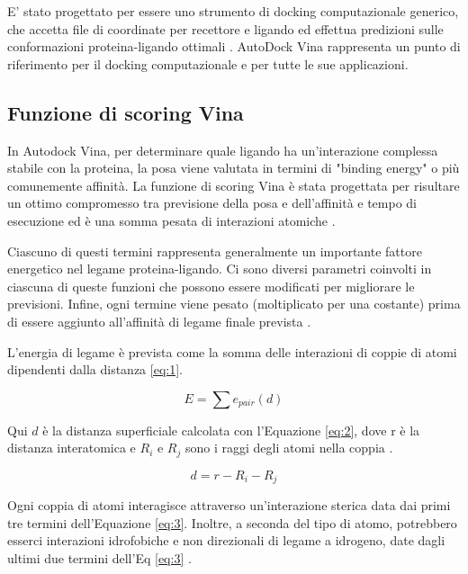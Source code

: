 E' stato progettato per essere uno strumento di docking computazionale generico, che accetta file di coordinate per recettore e ligando ed effettua predizioni sulle conformazioni proteina-ligando ottimali \cite{forli_computational_2016}.
AutoDock Vina rappresenta un punto di riferimento per il docking computazionale e per tutte le sue applicazioni.

\subsection{Funzione di scoring Vina} \label{scoring_function_vina}
In Autodock Vina, per determinare quale ligando ha un'interazione complessa stabile con la proteina, la posa viene valutata in termini di "binding energy" o più comunemente affinità.
La funzione di scoring Vina è stata progettata per risultare un ottimo compromesso tra previsione della posa e dell'affinità e tempo di esecuzione ed è una somma pesata di interazioni atomiche \cite{koes_lessons_2013}. 

Ciascuno di questi termini rappresenta generalmente un importante fattore energetico nel legame proteina-ligando. 
Ci sono diversi parametri coinvolti in ciascuna di queste funzioni che possono essere modificati per migliorare le previsioni. Infine, ogni termine viene pesato (moltiplicato per una costante) prima di essere aggiunto all'affinità di legame finale prevista \cite{quiroga_vinardo_2016}. 

L'energia di legame è prevista come la somma delle interazioni di coppie di atomi dipendenti dalla distanza \ref{eq:1}.

\begin{equation} \label{eq:1}
    E = \sum{e_{pair}}{(d)}
\end{equation} 

Qui \(d\) è la distanza superficiale calcolata con l'Equazione \ref{eq:2}, dove r è la distanza interatomica e \(R_i\) e \(R_j\) sono i raggi degli atomi nella coppia \cite{quiroga_vinardo_2016}. 

\begin{equation} \label{eq:2}
    d = r - R_i - R_j
\end{equation} 

Ogni coppia di atomi interagisce attraverso un'interazione sterica data dai primi tre termini dell'Equazione \ref{eq:3}. 
Inoltre, a seconda del tipo di atomo, potrebbero esserci interazioni idrofobiche e non direzionali di legame a idrogeno, date dagli ultimi due termini dell'Eq \ref{eq:3} \cite{quiroga_vinardo_2016}.

